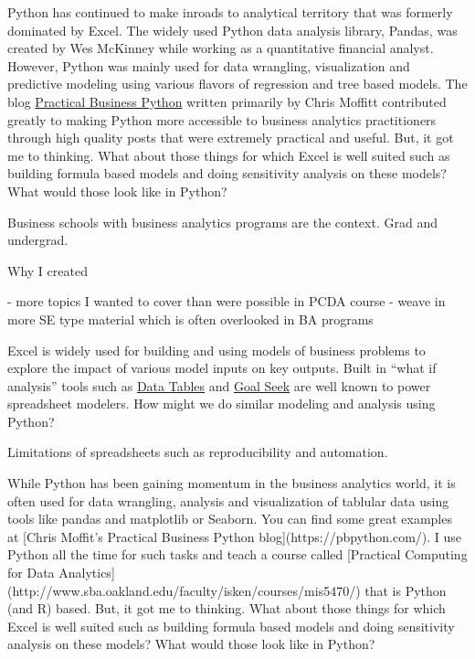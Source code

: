 \documentclass[ited,blindrev]{informs3}              %
\begin{document}
Python has continued to make inroads to analytical territory that was formerly dominated by Excel. The widely used Python data analysis library, Pandas, was created by Wes McKinney while working as a quantitative financial analyst. However, Python was mainly used for data wrangling, visualization and predictive modeling using various flavors of regression and tree based models. The blog \href{https://pbpython.com/}{Practical Business Python} written primarily by Chris Moffitt contributed greatly to making Python more accessible to business analytics practitioners through high quality posts that were extremely practical and useful. But, it got me to thinking. What about those things for which Excel is well suited such as building formula based models and doing sensitivity analysis on these models? What would those look like in Python?

Business schools with business analytics programs are the context. Grad and undergrad.

Why I created 

- more topics I wanted to cover than were possible in PCDA course
- weave in more SE type material which is often overlooked in BA programs

Excel is widely used for building and using models of business problems
to explore the impact of various model inputs on key outputs. Built in
``what if analysis'' tools such as \href{https://support.microsoft.com/en-us/office/calculate-multiple-results-by-using-a-data-table-e95e2487-6ca6-4413-ad12-77542a5ea50b}{Data
	Tables} and
\href{https://support.microsoft.com/en-us/office/use-goal-seek-to-find-the-result-you-want-by-adjusting-an-input-value-320cb99e-f4a4-417f-b1c3-4f369d6e66c7}{Goal
	Seek} are well known to power spreadsheet modelers. How might we do
similar modeling and analysis using Python?

Limitations of spreadsheets such as reproducibility and automation.


While Python has been gaining momentum in the business analytics world, it is often used for data wrangling, analysis and visualization of tablular data using tools like pandas and matplotlib or Seaborn. You can find some great examples at [Chris Moffit's Practical Business Python blog](https://pbpython.com/). I use Python all the time for such tasks and teach a course called [Practical Computing for Data Analytics](http://www.sba.oakland.edu/faculty/isken/courses/mis5470/) that is Python (and R) based. But, it got me to thinking. What about those things for which Excel is well suited such as building formula based models and doing sensitivity analysis on these models? What would those look like in Python?
\end{document}
